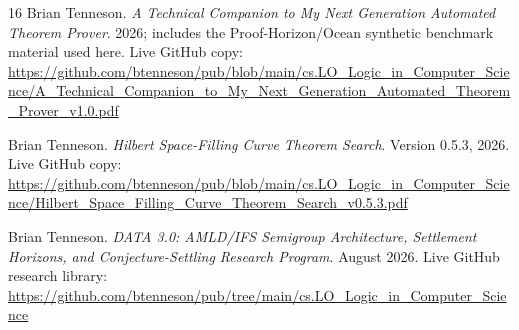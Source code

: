 \begin{thebibliography}{16}
Brian Tenneson.
\emph{A Technical Companion to My Next Generation Automated Theorem Prover}.
2026; includes the Proof-Horizon/Ocean synthetic benchmark material used here. Live GitHub copy:
\url{https://github.com/btenneson/pub/blob/main/cs.LO_Logic_in_Computer_Science/A_Technical_Companion_to_My_Next_Generation_Automated_Theorem_Prover_v1.0.pdf}

Brian Tenneson.
\emph{Hilbert Space-Filling Curve Theorem Search}.
Version 0.5.3, 2026. Live GitHub copy:
\url{https://github.com/btenneson/pub/blob/main/cs.LO_Logic_in_Computer_Science/Hilbert_Space_Filling_Curve_Theorem_Search_v0.5.3.pdf}

Brian Tenneson.
\emph{DATA 3.0: AMLD/IFS Semigroup Architecture, Settlement Horizons, and Conjecture-Settling Research Program}.
August 2026. Live GitHub research library:
\url{https://github.com/btenneson/pub/tree/main/cs.LO_Logic_in_Computer_Science}

\end{thebibliography}


